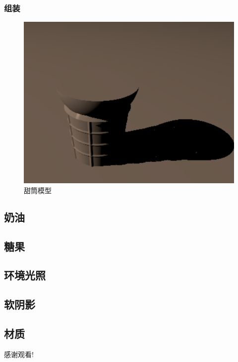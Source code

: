 \documentclass[aspectratio=169]{ctexbeamer} %
\begin{document}
\begin{frame}
    \frametitle{组装}
    \begin{figure}[htbp]
        \centering
        \includegraphics[height=.75\textheight]{images/pre/cone/final.pdf}
        \caption{甜筒模型}
        \label{fig:cone_model}
    \end{figure}
\end{frame}
\subsection{奶油}

\subsection{糖果}
\subsection{环境光照}
\subsection{软阴影}
\subsection{材质}

\begin{frame}
    \begin{center}
        \Huge{感谢观看!}
    \end{center}
\end{frame}
\end{document}
